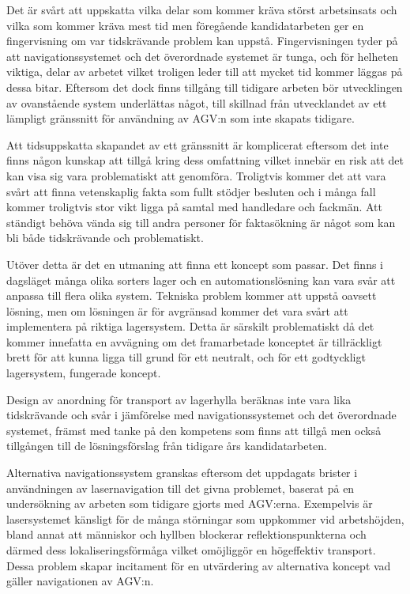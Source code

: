 \documentclass[a4paper,11pt]{article}
\begin{document}
Det är svårt att uppskatta vilka delar som kommer kräva störst arbetsinsats
och vilka som kommer kräva mest tid men föregående kandidatarbeten ger en
fingervisning om var tidskrävande problem kan uppstå. Fingervisningen tyder
på att navigationssystemet och det överordnade systemet är tunga, och för
helheten viktiga, delar av arbetet vilket troligen leder till att mycket
tid kommer läggas på dessa bitar. Eftersom det dock finns tillgång till
tidigare arbeten bör utvecklingen av ovanstående system underlättas något,
till skillnad från utvecklandet av ett lämpligt gränssnitt för användning
av AGV:n som inte skapats tidigare. 

Att tidsuppskatta skapandet av ett gränssnitt är komplicerat eftersom det
inte finns någon kunskap att tillgå kring dess omfattning vilket innebär en
risk att det kan visa sig vara problematiskt att genomföra. Troligtvis
kommer det att vara svårt att finna vetenskaplig fakta som fullt stödjer
besluten och i många fall kommer troligtvis stor vikt ligga på samtal med
handledare och fackmän. Att ständigt behöva vända sig till andra personer
för faktasökning är något som kan bli både tidskrävande och problematiskt.

Utöver detta är det en utmaning att finna ett koncept som passar. Det finns
i dagsläget många olika sorters lager och en automationslösning kan vara
svår att anpassa till flera olika system. Tekniska problem kommer att
uppstå oavsett lösning, men om lösningen är för avgränsad kommer det vara
svårt att implementera på riktiga lagersystem. Detta är särskilt
problematiskt då det kommer innefatta en avvägning om det framarbetade
konceptet är tillräckligt brett för att kunna ligga till grund för ett
neutralt, och för ett godtyckligt lagersystem, fungerade koncept.

Design av anordning för transport av lagerhylla beräknas inte vara lika
tidskrävande och svår i jämförelse med navigationssystemet och det
överordnade systemet, främst med tanke på den kompetens som finns att
tillgå men också tillgången till de lösningsförslag från tidigare års
kandidatarbeten.

Alternativa navigationssystem granskas eftersom det uppdagats brister i
användningen av lasernavigation till det givna problemet, baserat på en
undersökning av arbeten som tidigare gjorts med AGV:erna. Exempelvis är
lasersystemet känsligt för de många störningar som uppkommer vid
arbetshöjden, bland annat att människor och hyllben blockerar
reflektionspunkterna och därmed dess lokaliseringsförmåga vilket omöjliggör
en högeffektiv transport\cite{laser}. Dessa problem skapar incitament för
en utvärdering av alternativa koncept vad gäller navigationen av AGV:n.
\end{document}
